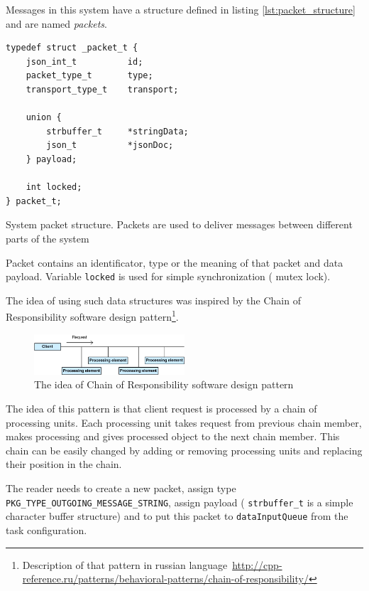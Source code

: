 Messages in this system have a structure defined in listing 
\ref{lst:packet_structure} and are named \textit{packets}.

\begin{listing}[H]
\begin{verbatim}
typedef struct _packet_t {
	json_int_t			id;
	packet_type_t		type;
	transport_type_t 	transport;
	
	union {
		strbuffer_t		*stringData;
		json_t			*jsonDoc;
	} payload;
	
	int locked;
} packet_t;
\end{verbatim}
\caption{System packet structure. Packets are used to deliver messages between
different parts of the system}
\label{lst:packet_structure}
\end{listing}

Packet contains an identificator, type or the meaning of that packet  and data
payload. Variable \texttt{locked} is used for simple synchronization ( mutex
lock).

The idea of using such data structures was inspired by the Chain of Responsibility software design pattern\footnote{Description of that pattern in russian language~\url{http://cpp-reference.ru/patterns/behavioral-patterns/chain-of-responsibility/} }.
\begin{center}
 \begin{figure}[H]
	\includegraphics[width=0.5\textwidth]{../images/implementation/embedded_server/demo-chain-of-responsibility-1.png}
	\caption{The idea of  Chain of Responsibility software design pattern}
	\label{fig:chain_of_responsibility}
 \end{figure}
\end{center}
The idea of this pattern is that client request is processed by a chain of processing units.
Each processing unit takes request from previous chain member, makes processing and gives processed object to the next chain member.
This chain can be easily changed by adding or removing processing units and replacing their position in the chain.

The reader needs to create a new packet, assign type
\texttt{PKG\_TYPE\_OUTGOING\_MESSAGE\_STRING}, assign payload (
\texttt{strbuffer\_t} is a simple character buffer structure) and to put this
packet to \texttt{dataInputQueue} from the task configuration.

